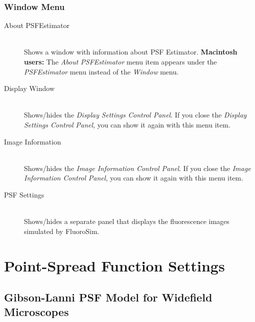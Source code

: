 \documentclass[11pt,titlepage,twoside]{article}
\begin{document}
\subsubsection{Window Menu}

\begin{description}

  \item[About PSFEstimator] \hfill \\
  Shows a window with information about PSF Estimator. \textbf{Macintosh users:} The \emph{About PSFEstimator} menu item appears under the \emph{PSFEstimator} menu instead of the \emph{Window} menu. 

  \item[Display Window] \hfill \\
  Shows/hides the \emph{Display Settings Control Panel}. If you close the \emph{Display Settings Control Panel}, you can show it again with this menu item.
  
  \item[Image Information] \hfill \\
    Shows/hides the \emph{Image Information Control Panel}. If you close the \emph{Image Information Control Panel}, you can show it again with this menu item.
  
  \item[PSF Settings] \hfill \\
  Shows/hides a separate panel that displays the fluorescence images simulated by FluoroSim.

\end{description}

\section{Point-Spread Function Settings}
\label{sec:PointSpreadFunctionSettings}

\subsection{Gibson-Lanni PSF Model for Widefield Microscopes}
\end{document}
